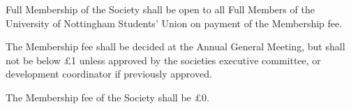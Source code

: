 \begin{clause}  
  Full Membership of the Society shall be open to all Full Members of the University of Nottingham Students' Union on payment of the Membership fee.
\end{clause}

\begin{subclause}
  The Membership fee shall be decided at the Annual General Meeting, but shall not be below \pounds 1 unless approved by the societies executive committee, or development coordinator if previously approved.
\end{subclause}

\begin{subclause}  
  The Membership fee of the Society shall be \pounds 0.
\end{subclause}
